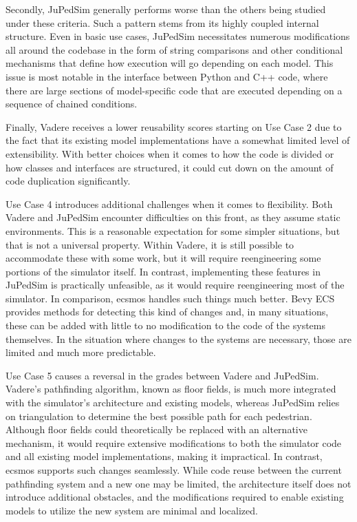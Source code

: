 \documentclass[twoside, 11pt]{article}
\begin{document}
Secondly, JuPedSim generally performs worse than the others being studied under these criteria. Such a pattern stems from its highly coupled internal structure. Even in basic use cases, JuPedSim necessitates numerous modifications all around the codebase in the form of string comparisons and other conditional mechanisms that define how execution will go depending on each model. This issue is most notable in the interface between Python and C++ code, where there are large sections of model-specific code that are executed depending on a sequence of chained conditions.

Finally, Vadere receives a lower reusability scores starting on Use Case 2 due to the fact that its existing model implementations have a somewhat limited level of extensibility. With better choices when it comes to how the code is divided or how classes and interfaces are structured, it could cut down on the amount of code duplication significantly.

Use Case 4 introduces additional challenges when it comes to flexibility. Both Vadere and JuPedSim encounter difficulties on this front, as they assume static environments. This is a reasonable expectation for some simpler situations, but that is not a universal property. Within Vadere, it is still possible to accommodate these with some work, but it will require reengineering some portions of the simulator itself. In contrast, implementing these features in JuPedSim is practically unfeasible, as it would require reengineering most of the simulator. In comparison, \gls{ecsmos} handles such things much better. Bevy ECS provides methods for detecting this kind of changes and, in many situations, these can be added with little to no modification to the code of the systems themselves. In the situation where changes to the systems are necessary, those are limited and much more predictable. 

Use Case 5 causes a reversal in the grades between Vadere and JuPedSim. Vadere's pathfinding algorithm, known as floor fields, is much more  integrated with the simulator's architecture and existing models, whereas JuPedSim relies on triangulation to determine the best possible path for each pedestrian. Although floor fields could theoretically be replaced with an alternative mechanism, it would require extensive modifications to both the simulator code and all existing model implementations, making it impractical. In contrast, \gls{ecsmos} supports such changes seamlessly. While code reuse between the current pathfinding system and a new one may be limited, the architecture itself does not introduce additional obstacles, and the modifications required to enable existing models to utilize the new system are minimal and localized.
\end{document}
